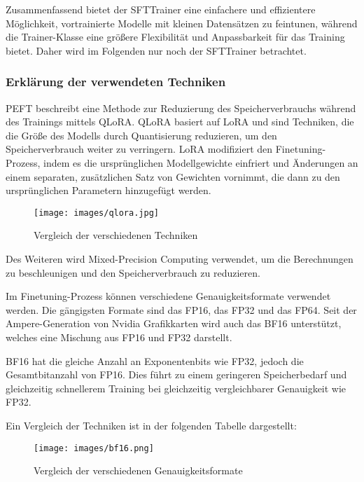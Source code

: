 \documentclass[german,report]{i1thesis}
\begin{document}
Zusammenfassend bietet der \ac{SFTTrainer} eine einfachere und effizientere Möglichkeit, vortrainierte Modelle mit kleinen Datensätzen zu feintunen, während die Trainer-Klasse eine größere Flexibilität und Anpassbarkeit für das Training bietet.
Daher wird im Folgenden nur noch der \ac{SFTTrainer} betrachtet.

\subsubsection{Erklärung der verwendeten Techniken}%

\ac{PEFT} beschreibt eine Methode zur Reduzierung des Speicherverbrauchs während des Trainings mittels \ac{QLoRA}.
\ac{QLoRA} basiert auf \ac{LoRA} und sind Techniken, die die Größe des Modells durch Quantisierung reduzieren, um den Speicherverbrauch weiter zu verringern.
\ac{LoRA} modifiziert den Finetuning-Prozess, indem es die ursprünglichen Modellgewichte einfriert und Änderungen an einem separaten, zusätzlichen Satz von Gewichten vornimmt, die dann zu den ursprünglichen Parametern hinzugefügt werden.

\begin{figure}[H]
    \centering
    \texttt{[image: images/qlora.jpg]}
    \caption{Vergleich der verschiedenen Techniken \autocite[S. 3]{qlora}}%
    \label{fig:qlora}
\end{figure}

Des Weiteren wird Mixed-Precision Computing verwendet, um die Berechnungen zu beschleunigen und den Speicherverbrauch zu reduzieren.

Im Finetuning-Prozess können verschiedene Genauigkeitsformate verwendet werden.
Die gängigsten Formate sind das \ac{FP16}, das \ac{FP32} und das \ac{FP64}.
Seit der Ampere-Generation von Nvidia Grafikkarten wird auch das \ac{BF16} unterstützt, welches eine Mischung aus \ac{FP16} und \ac{FP32} darstellt.

\ac{BF16} hat die gleiche Anzahl an Exponentenbits wie \ac{FP32}, jedoch die Gesamtbitanzahl von \ac{FP16}.
Dies führt zu einem geringeren Speicherbedarf und gleichzeitig schnellerem Training bei gleichzeitig vergleichbarer Genauigkeit wie \ac{FP32}.
 \autocite{bf16}

Ein Vergleich der Techniken ist in der folgenden Tabelle dargestellt:

\begin{figure}[H]
    \centering
    \texttt{[image: images/bf16.png]}
    \caption{Vergleich der verschiedenen Genauigkeitsformate \autocite{bf16-pic}}%
    \label{fig:bf16}
\end{figure}
\end{document}
